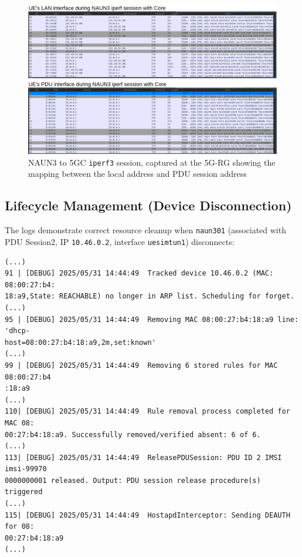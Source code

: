 \begin{figure}
    \centering
    \includegraphics[width=1\linewidth]{figs/naun3_to_core_ue_view.png}
    \caption{\acs{NAUN3} to \acs{5GC} \texttt{iperf3} session, captured at the \acs{5G-RG} showing the mapping between the local address and \acs{PDU} session address}
    \label{fig:naun3_to_core_ue_view}
\end{figure}

\subsection{Lifecycle Management (Device Disconnection)}

The logs demonstrate correct resource cleanup when \texttt{naun301} (associated with \ac{PDU} Session2, \ac{IP} \texttt{10.46.0.2}, interface \texttt{uesimtun1}) disconnects:

\begin{lstlisting}[caption=\texttt{naun301} disconnected and \acs{5G-RG}'s \texttt{interceptor} proceeds to deauthenticating it removing traffic mapping rules for it and releasing it's dedicated \acs{PDU} session,label={lst:naun301_removed}]
(...)
91 | [DEBUG] 2025/05/31 14:44:49  Tracked device 10.46.0.2 (MAC: 08:00:27:b4:
18:a9,State: REACHABLE) no longer in ARP list. Scheduling for forget.
(...)
95 | [DEBUG] 2025/05/31 14:44:49  Removing MAC 08:00:27:b4:18:a9 line: 'dhcp-
host=08:00:27:b4:18:a9,2m,set:known'
(...)
99 | [DEBUG] 2025/05/31 14:44:49  Removing 6 stored rules for MAC 08:00:27:b4
:18:a9
(...)
110| [DEBUG] 2025/05/31 14:44:49  Rule removal process completed for MAC 08:
00:27:b4:18:a9. Successfully removed/verified absent: 6 of 6.
(...)
113| [DEBUG] 2025/05/31 14:44:49  ReleasePDUSession: PDU ID 2 IMSI imsi-99970
0000000001 released. Output: PDU session release procedure(s) triggered
(...)
115| [DEBUG] 2025/05/31 14:44:49  HostapdInterceptor: Sending DEAUTH for 08:
00:27:b4:18:a9
(...)
\end{lstlisting}

